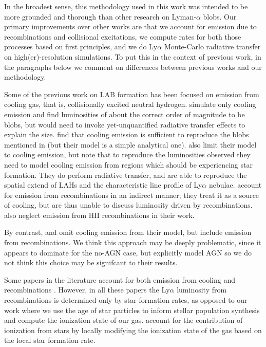 In the broadest sense, this methodology used in this work was intended to be more grounded and thorough than other research on Lyman-$\alpha$ blobs.
Our primary improvements over other works are that we account for emission due to recombinations and collisional excitations, we compute rates for both those processes based on first principles, and we do Ly$\alpha$ Monte-Carlo radiative transfer on  high(er)-resolution simulations. 
To put this in the context of previous work, in the paragraphs below we comment on differences between previous works and our methodology.

Some of the previous work on LAB formation has been focused on emission from cooling gas, that is, collisionally excited neutral hydrogen.
\citet{Fardal2001} simulate only cooling emission and find luminosities of about the correct order of magnitude to be blobs, but would need to invoke yet-unquantified radiative transfer effects to explain the size.
\citet{Haiman2000} find that cooling emission is sufficient to reproduce the blobs mentioned in \citet{Steidel2000} (but their model is a simple analytical one).
\citet{Faucher-Giguere2010} also limit their model to cooling emission, but note that to reproduce the luminosities observed they need to model cooling emission from regions which should be experiencing star formation.
They do perform radiative transfer, and are able to reproduce the spatial extend of LAHs and the characteristic line profile of Ly$\alpha$ nebulae.
\citet{Rosdahl2012} account for emission from recombinations in an indirect manner; they treat it as a source of cooling, but are thus unable to discuss luminosity driven by recombinations.
\citet{Goerdt2010} also neglect emission from HII recombinations in their work.

By contrast, \citet{Cantalupo2005} and \citet{Gronke2017} omit cooling emission from their model, but include emission from recombinations.
We think this approach may be deeply problematic, since it appears to dominate for the no-AGN case, but \citet{Gronke2017} explicitly model AGN so we do not think this choice may be signifcant to their results.

Some papers in the literature account for both emission from cooling and recombinations \citep{Cen2013, Furlanetto2005, Geach2016, Smailagi2016}.
However, in all these papers the Ly$\alpha$ luminosity from recombinations is determined only by star formation rates, as opposed to our work where we use the age of star particles to inform stellar population synthesis and compute the ionization state of our gas.
\citet{Geach2016} account for the contribution of ionization from stars by locally modifying the ionization state of the gas based on the local star formation rate.

